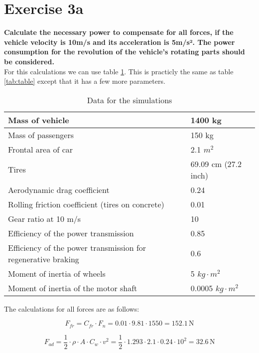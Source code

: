 \documentclass[final]{scrreprt} %
\begin{document}
\section{Exercise 3a}
{\bf Calculate the necessary power to compensate for all forces, if the vehicle velocity is 10m/s and its acceleration is 5m/s². The power consumption for the revolution of the vehicle's rotating parts should be considered.} \\

For this calculations we can use table \ref{tab:table1}. This is practicly the same as table \ref{tab:table} except that it has a few more parameters. 

\begin{table}[h]
\begin{center}
\caption{Data for the simulations}
\label{tab:table1}
\begin{tabular}{ | l | l |}
    \hline
    Mass of vehicle & 1400 kg \\ \hline
    Mass of passengers & 150 kg \\\hline
    Frontal area of car    & 2.1 $m^2$ \\\hline
    Tires	         & 69.09 cm (27.2 inch) \\\hline
    Aerodynamic drag coefficient & 0.24 \\\hline
    Rolling friction coefficient (tires on concrete) & 0.01 \\\hline
    Gear ratio at 10 m/s  & 10 \\\hline
    Efficiency of the power transmission & 0.85 \\\hline
    Efficiency of the power transmission for regenerative braking & 0.6 \\\hline
    Moment of inertia of wheels               & 5 $kg \cdot m^2$ \\\hline
    Moment of inertia of the motor shaft                 & 0.0005 $kg \cdot m^2$ \\\hline
\end{tabular}
\end{center}
\end{table}

The calculations for all forces are as follows:

\begin{equation}
F_{fr} = C_{fr} \cdot F_{n} = 0.01 \cdot 9.81 \cdot 1550 = 152.1\, \mathrm{N}
\end {equation}

\begin{equation}
F_{ad} = \frac{1}{2} \cdot \rho \cdot A \cdot C_{w} \cdot v^2 = \frac{1}{2} \cdot 1.293 \cdot 2.1  \cdot 0.24 \cdot 10^2 = 32.6\, \mathrm{N}
\end{equation}
\end{document}
